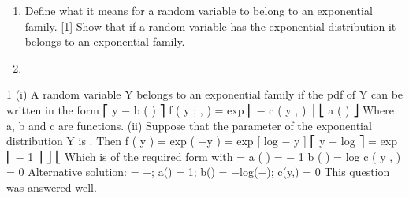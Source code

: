 \documentclass[a4paper,12pt]{article}
\begin{document}
\begin{enumerate}
\item 

Define what it means for a random variable to belong to an exponential
family.
[1]
Show that if a random variable has the exponential distribution it belongs to an
exponential family.

\item 

\end{enumerate}
\newpage

1
(i)
A random variable Y belongs to an exponential family if the pdf of Y can be
written in the form
⎡ y \theta  − b ( \theta  )
⎤
f ( y ; \theta  , \phi  ) = exp ⎢
− c ( y , \phi  ) ⎥
⎣ a ( \phi  )
⎦
Where a, b and c are functions.
(ii)
Suppose that the parameter of the exponential distribution Y is \lambda . Then
f ( y ) = \lambda  exp ( −\lambda  y )
= exp [ log \lambda  − \lambda  y ]
⎡ \lambda  y − log \lambda  ⎤
= exp ⎢
− 1 ⎥ ⎦
⎣
Which is of the required form with
\theta =\lambda 
a ( \phi  ) = − 1
b ( \theta  ) = log \theta 
c ( y , \phi  ) = 0
Alternative solution: \theta  = −\lambda ; a(\phi ) = 1; b(\theta ) = −log(−\theta ); c(y,\phi ) = 0
This question was answered well.
\end{document}

